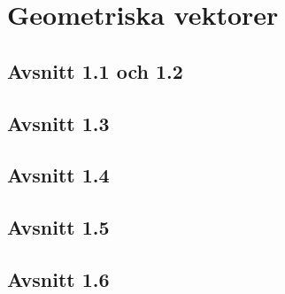 \section{Geometriska vektorer}
\subsection*{Avsnitt 1.1 och 1.2}



\subsection*{Avsnitt 1.3}


\subsection*{Avsnitt 1.4}



\subsection*{Avsnitt 1.5}








\subsection*{Avsnitt 1.6}












